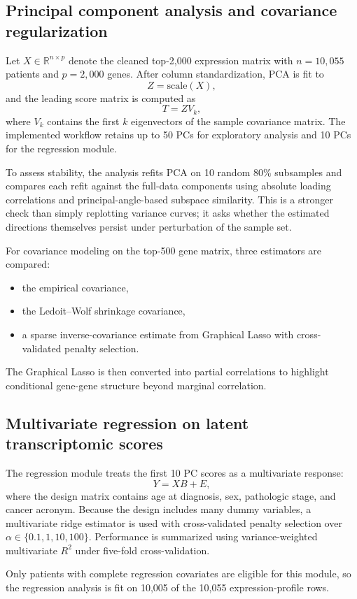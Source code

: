 \documentclass[11pt]{article}
\begin{document}
\subsection{Principal component analysis and covariance regularization}
Let $X \in \mathbb{R}^{n \times p}$ denote the cleaned top-2,000 expression matrix with $n = 10{,}055$ patients and $p = 2{,}000$ genes. After column standardization, PCA is fit to
\[
Z = \mathrm{scale}(X),
\]
and the leading score matrix is computed as
\[
T = ZV_k,
\]
where $V_k$ contains the first $k$ eigenvectors of the sample covariance matrix. The implemented workflow retains up to 50 PCs for exploratory analysis and 10 PCs for the regression module.

To assess stability, the analysis refits PCA on 10 random 80\% subsamples and compares each refit against the full-data components using absolute loading correlations and principal-angle-based subspace similarity. This is a stronger check than simply replotting variance curves; it asks whether the estimated directions themselves persist under perturbation of the sample set.

For covariance modeling on the top-500 gene matrix, three estimators are compared:
\begin{itemize}
  \item the empirical covariance,
  \item the Ledoit--Wolf shrinkage covariance,
  \item a sparse inverse-covariance estimate from Graphical Lasso with cross-validated penalty selection.
\end{itemize}
The Graphical Lasso is then converted into partial correlations to highlight conditional gene-gene structure beyond marginal correlation.

\subsection{Multivariate regression on latent transcriptomic scores}
The regression module treats the first 10 PC scores as a multivariate response:
\[
Y = XB + E,
\]
where the design matrix contains age at diagnosis, sex, pathologic stage, and cancer acronym. Because the design includes many dummy variables, a multivariate ridge estimator is used with cross-validated penalty selection over $\alpha \in \{0.1, 1, 10, 100\}$. Performance is summarized using variance-weighted multivariate $R^2$ under five-fold cross-validation.

Only patients with complete regression covariates are eligible for this module, so the regression analysis is fit on 10,005 of the 10,055 expression-profile rows.
\end{document}
